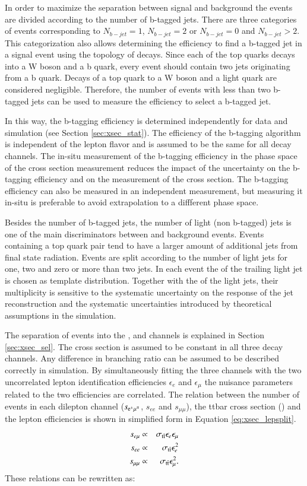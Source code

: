 In order to maximize the separation between signal and background the events are divided according to the number of b-tagged jets.
There are three categories of events corresponding to $N_{b-jet}=1$, $N_{b-jet}=2$ or $N_{b-jet}=0$ and $N_{b-jet}>2$.
This categorization also allows determining the efficiency to find a b-tagged jet in a signal event using the topology of \ttbar decays.
Since each of the top quarks decays into a W boson and a b quark, every \ttbar event should contain two jets originating from a b quark.
Decays of a top quark to a W boson and a light quark are considered negligible.
Therefore, the number of \ttbar events with less than two b-tagged jets can be used to measure the efficiency to select a b-tagged jet.

In this way, the b-tagging efficiency is determined independently for data and simulation (see Section \ref{sec:xsec_stat}). The efficiency of the b-tagging algorithm is independent of the lepton flavor and is  assumed to be the same for all \ttbar decay channels.
The in-situ measurement of the b-tagging efficiency in the phase space of the \ttbar cross section measurement reduces the impact of the uncertainty on the b-tagging efficiency and on the measurement of the \ttbar cross section.
The b-tagging efficiency can also be measured in an independent measurement, but measuring it in-situ is preferable to avoid extrapolation to a diffferent phase space.

Besides the number of b-tagged jets, the number of light (non b-tagged) jets is one of the main discriminators between \ttbar and background events.
Events containing a top quark pair tend to have a larger amount of additional jets from final state radiation.
Events are split according to the number of light jets for one, two and zero or more than two jets.
In each event the \pt of the trailing light jet is chosen as template distribution.
Together with the \pt of the light jets, their multiplicity is sensitive to the systematic uncertainty on the response of the jet reconstruction and
the systematic uncertainties introduced by theoretical assumptions in the simulation.

The separation of events into the \emu, \mumu and \ee channels is explained in Section \ref{sec:xsec_sel}. The \ttbar cross section is assumed to be constant in all three decay channels. Any difference in branching 
ratio can be assumed to be described correctly in simulation.
By simultaneously fitting the three channels with the two uncorrelated lepton identification efficiencies $\epsilon_e$ and $\epsilon_\mu$ the nuisance parameters related to the two efficiencies are correlated. 
The relation between the number of \ttbar events in each dilepton channel ($s_{\mathrm{e}^\pm\mu^\mp}$, $s_{ee}$ and $s_{\mu\mu}$), the ttbar cross section (\stt) and the lepton 
efficiencies  is shown in simplified form in Equation \ref{eq:xsec_lepsplit}.
\begin{eqnarray}
s_{e \mu}  &\propto& \sigma_\mathrm{t\bar{t}} \epsilon_{e} \epsilon_{\mu}  \\
s_{ee}  &\propto&  \sigma_\mathrm{t\bar{t}} \epsilon_{e}^2  \\
s_{\mu \mu}  &\propto&  \sigma_\mathrm{t\bar{t}} \epsilon_{\mu}^2
\label{eq:xsec_lepsplit}.
\end{eqnarray}
These relations can be rewritten as: 

